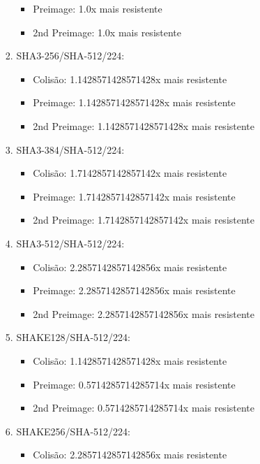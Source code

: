 \documentclass[12pt, a4paper]{article}
\begin{document}
\begin{enumerate}
\begin{enumerate}
\begin{enumerate}
\begin{itemize}
 \item Preimage: 1.0x mais resistente

 \item 2nd Preimage: 1.0x mais resistente
 \end{itemize}
\item SHA3-256/SHA-512/224:
 \begin{itemize}
 \item Colisão: 1.1428571428571428x mais resistente

 \item Preimage: 1.1428571428571428x mais resistente

 \item 2nd Preimage: 1.1428571428571428x mais resistente
 \end{itemize}
\item SHA3-384/SHA-512/224:
 \begin{itemize}
 \item Colisão: 1.7142857142857142x mais resistente

 \item Preimage: 1.7142857142857142x mais resistente

 \item 2nd Preimage: 1.7142857142857142x mais resistente
 \end{itemize}
\item SHA3-512/SHA-512/224:
 \begin{itemize}
 \item Colisão: 2.2857142857142856x mais resistente

 \item Preimage: 2.2857142857142856x mais resistente

 \item 2nd Preimage: 2.2857142857142856x mais resistente
 \end{itemize}
\item SHAKE128/SHA-512/224:
 \begin{itemize}
 \item Colisão: 1.1428571428571428x mais resistente

 \item Preimage: 0.5714285714285714x mais resistente

 \item 2nd Preimage: 0.5714285714285714x mais resistente
 \end{itemize}
\item SHAKE256/SHA-512/224:
 \begin{itemize}
 \item Colisão: 2.2857142857142856x mais resistente


\end{itemize}
\end{enumerate}
\end{enumerate}
\end{enumerate}
\end{document}
